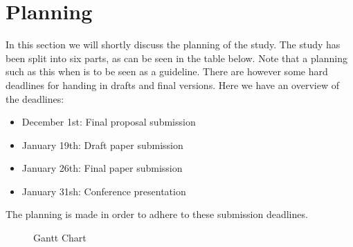 \section{Planning}
\label{sec:planning}

In this section we will shortly discuss the planning of the study.
The study has been split into six parts, as can be seen in the table below.
Note that a planning such as this when is to be seen as a guideline.
There are however some hard deadlines for handing in drafts and final versions.
Here we have an overview of the deadlines:

\begin{itemize}
    \item December 1st: Final proposal submission
    \item January 19th: Draft paper submission
    \item January 26th: Final paper submission
    \item January 31sh: Conference presentation
\end{itemize}
The planning is made in order to adhere to these submission deadlines.

\begin{figure}[ht]
    \begin{center}
    \end{center}
    \caption{Gantt Chart}
    \label{fig:figure2}
\end{figure}


